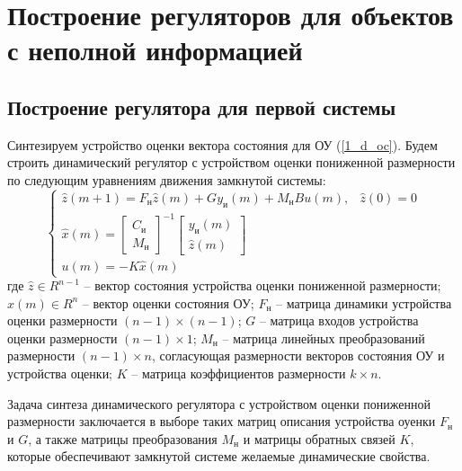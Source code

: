 \chapter{Построение регуляторов для объектов с неполной информацией}
\label{ch:chap3}
\section{Построение регулятора для первой системы}
Синтезируем устройство оценки вектора состояния для ОУ (\ref{1_d_oc}). Будем строить динамический регулятор с устройством оценки пониженной размерности по следующим уравнениям движения замкнутой системы:
\begin{equation}
	\begin{cases}
		\hat{z} (m+1) = F_\text{н} \hat{z} (m) + G y_\text{и} (m) + M_\text{н} Bu(m), & \hat{z}(0) = 0\\
		\hat{x}(m) = \begin{bmatrix}
			C_\text{и}\\ M_\text{н}
		\end{bmatrix}^{-1} \begin{bmatrix}
		y_\text{и} (m)\\ \hat{z} (m)
		\end{bmatrix}\\
		u(m) = -K \hat{x} (m)
	\end{cases}
\end{equation}
где $\hat{z} \in R^{n - 1}$ -- вектор состояния устройства оценки пониженной размерности; $\hat{x}(m) \in R^n$ -- вектор оценки состояния ОУ; $F_\text{н}$ -- матрица динамики устройства оценки размерности $(n - 1) \times (n - 1)$; $G$ -- матрица входов устройства оценки размерности $(n - 1) \times 1$; $M_\text{н}$ -- матрица линейных преобразований размерности $(n - 1) \times n$, согласующая размерности векторов состояния ОУ и устройства оценки; $K$ -- матрица коэффициентов размерности $k \times n$.

Задача синтеза динамического регулятора с устройством оценки пониженной размерности заключается в выборе таких матриц описания устройства оуенки $F_\text{н}$ и $G$, а также матрицы преобразования $M_\text{н}$ и матрицы обратных связей $K$, которые обеспечивают замкнутой системе желаемые динамические свойства.

